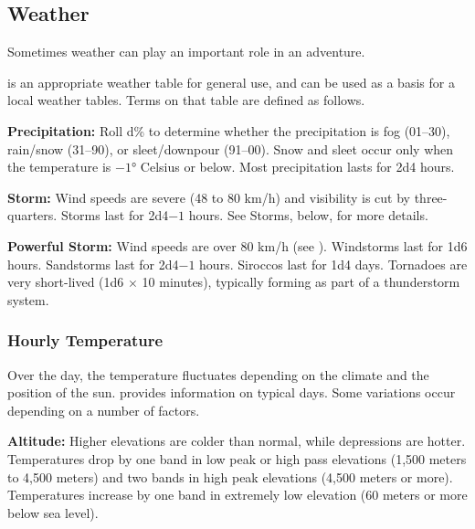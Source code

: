 \subsection{Weather}
Sometimes weather can play an important role in an adventure.

 is an appropriate weather table for general use, and can be used as a basis for a local weather tables. Terms on that table are defined as follows.


\textbf{Precipitation:} Roll d\% to determine whether the precipitation is fog (01--30), rain/snow (31--90), or sleet/downpour (91--00). Snow and sleet occur only when the temperature is $-1$° Celsius or below. Most precipitation lasts for 2d4 hours.

\textbf{Storm:} Wind speeds are severe (48 to 80 km/h) and visibility is cut by three-quarters. Storms last for 2d4$-1$ hours. See Storms, below, for more details.

\textbf{Powerful Storm:} Wind speeds are over 80 km/h (see ). Windstorms last for 1d6 hours. Sandstorms last for 2d4$-1$ hours. Siroccos last for 1d4 days. Tornadoes are very short-lived (1d6 $\times$ 10 minutes), typically forming as part of a thunderstorm system.

\subsubsection{Hourly Temperature}
Over the day, the temperature fluctuates depending on the climate and the position of the sun.  provides information on typical days. Some variations occur depending on a number of factors.

\textbf{Altitude:} Higher elevations are colder than normal, while depressions are hotter. Temperatures drop by one band in low peak or high pass elevations (1,500 meters to 4,500 meters) and two bands in high peak elevations (4,500 meters or more). Temperatures increase by one band in extremely low elevation (60 meters or more below sea level).

